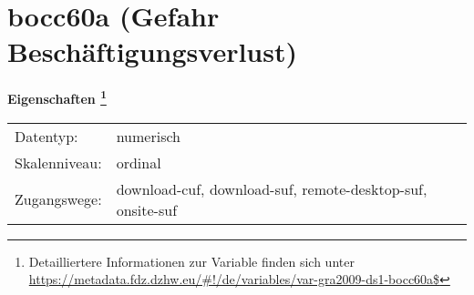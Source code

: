 
    \setcounter{footnote}{0}

    \vspace*{-1.8cm}
	\section{bocc60a (Gefahr Beschäftigungsverlust)}
	\label{section:bocc60a}



    \vspace*{0.5cm}
    \noindent\textbf{Eigenschaften
	\footnote{Detailliertere Informationen zur Variable finden sich unter
		\url{https://metadata.fdz.dzhw.eu/\#!/de/variables/var-gra2009-ds1-bocc60a$}}}\\
	\begin{tabularx}{\hsize}{@{}lX}
	Datentyp: & numerisch \\
	Skalenniveau: & ordinal \\
	Zugangswege: &
	  download-cuf, 
	  download-suf, 
	  remote-desktop-suf, 
	  onsite-suf
 \\
    \end{tabularx}



